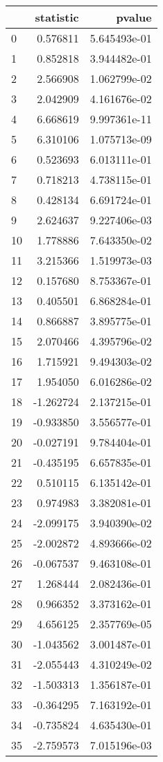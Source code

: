 \begin{tabular}{lrr}
\toprule
{} &  statistic &        pvalue \\
\midrule
0  &   0.576811 &  5.645493e-01 \\
1  &   0.852818 &  3.944482e-01 \\
2  &   2.566908 &  1.062799e-02 \\
3  &   2.042909 &  4.161676e-02 \\
4  &   6.668619 &  9.997361e-11 \\
5  &   6.310106 &  1.075713e-09 \\
6  &   0.523693 &  6.013111e-01 \\
7  &   0.718213 &  4.738115e-01 \\
8  &   0.428134 &  6.691724e-01 \\
9  &   2.624637 &  9.227406e-03 \\
10 &   1.778886 &  7.643350e-02 \\
11 &   3.215366 &  1.519973e-03 \\
12 &   0.157680 &  8.753367e-01 \\
13 &   0.405501 &  6.868284e-01 \\
14 &   0.866887 &  3.895775e-01 \\
15 &   2.070466 &  4.395796e-02 \\
16 &   1.715921 &  9.494303e-02 \\
17 &   1.954050 &  6.016286e-02 \\
18 &  -1.262724 &  2.137215e-01 \\
19 &  -0.933850 &  3.556577e-01 \\
20 &  -0.027191 &  9.784404e-01 \\
21 &  -0.435195 &  6.657835e-01 \\
22 &   0.510115 &  6.135142e-01 \\
23 &   0.974983 &  3.382081e-01 \\
24 &  -2.099175 &  3.940390e-02 \\
25 &  -2.002872 &  4.893666e-02 \\
26 &  -0.067537 &  9.463108e-01 \\
27 &   1.268444 &  2.082436e-01 \\
28 &   0.966352 &  3.373162e-01 \\
29 &   4.656125 &  2.357769e-05 \\
30 &  -1.043562 &  3.001487e-01 \\
31 &  -2.055443 &  4.310249e-02 \\
32 &  -1.503313 &  1.356187e-01 \\
33 &  -0.364295 &  7.163192e-01 \\
34 &  -0.735824 &  4.635430e-01 \\
35 &  -2.759573 &  7.015196e-03 \\
\bottomrule
\end{tabular}
